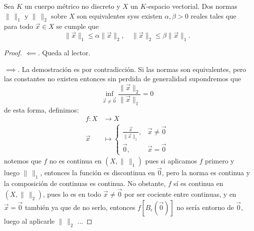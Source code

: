 \documentclass[topologia-analisis.tex]{subfiles}
\begin{document}
\begin{thm}
	Sea $K$ un cuerpo métrico no discreto y $X$ un $K$-espacio vectorial.
	Dos normas $\|\,\|_1$ y $\|\,\|_2$ sobre $X$ son equivalentes syss existen $\alpha,\beta > 0$ reales
	tales que para todo $\vec x \in X$ se cumple que
	$$ \|\vec x\|_1 \le \alpha\|\vec x\|_2,\quad \|\vec x\|_2 \le \beta\|\vec x\|_1. $$
\end{thm}
\begin{proof}
	$\impliedby$. Queda al lector.

	$\implies$. La demostración es por contradicción.
	Si las normas son equivalentes, pero las constantes no existen entonces sin perdida de generalidad supondremos que
	$$ \inf_{\vec x \ne \Vec 0} \frac{\|\vec x\|_2}{\|\vec x\|_1} = 0 $$
	de esta forma, definimos:
	\begin{align*}
		f \colon X &\longrightarrow X \\
		\vec x &\longmapsto
		\begin{cases}
			\frac{\vec x}{\|\vec x\|_1}, &\vec x\ne \Vec 0\\
			\Vec 0, &\vec x=\Vec 0
		\end{cases}
	\end{align*}
	notemos que $f$ no es continua en $(X, \|\,\|_1)$ pues si aplicamos $f$ primero y luego $\|\,\|_1$, entonces la función es discontinua en $\Vec 0$,
	pero la norma es continua y la composición de continuas es continua.
	No obstante, $f$ sí es continua en $(X, \|\,\|_2)$, pues lo es en todo $\vec x\ne \Vec 0$ por ser cociente entre continuas,
	y en $\vec x = \Vec 0$ también ya que de no serlo, entonces $f[B_\epsilon(\Vec 0)]$ no sería entorno de $\Vec 0$, luego al aplicarle $\|\,\|_2$ ...
\end{proof}
\end{document}
